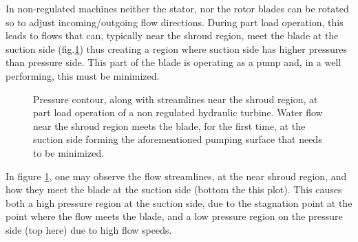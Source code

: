 In non-regulated machines neither the stator, nor the rotor blades can be rotated so to adjust incoming/outgoing flow directions. During part load operation, this leads to flows that can, typically near the shroud region, meet the blade at the suction side (fig.\ref{design-pumpS}) thus creating a region where suction side has higher pressures than pressure side. This part of the blade is operating as a pump and, in a well performing, this must be minimized. 

\begin{figure}[h!]
\begin{minipage}[b]{1\linewidth}
 \centering
\end{minipage}
\caption{Pressure contour, along with streamlines near the shroud region, at part load operation of a non regulated hydraulic turbine. Water flow near the shroud region meets the blade, for the first time, at the suction side forming the aforementioned pumping surface that needs to be minimized. }
\label{design-pumpS}
\end{figure}

In figure \ref{design-pumpS}, one may observe the flow streamlines, at the near shroud region, and how they meet the blade at the suction side (bottom the this plot). This causes both a high pressure region at the suction side, due to the stagnation point at the point where the flow meets the blade,  and a low pressure region on the pressure side (top here) due to high flow speeds.        

